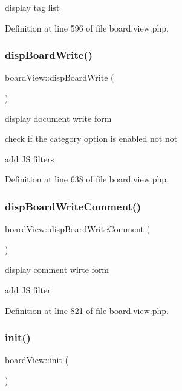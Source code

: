 display tag list 



Definition at line 596 of file board.\+view.\+php.

\mbox{\label{classboardView_a87d07de32e6b22b5b56eaa0e0f55e2a0}} 
\subsubsection{\texorpdfstring{disp\+Board\+Write()}{dispBoardWrite()}}
{\footnotesize\ttfamily board\+View\+::disp\+Board\+Write (\begin{DoxyParamCaption}{ }\end{DoxyParamCaption})}



display document write form 

check if the category option is enabled not not

add JS filters

Definition at line 638 of file board.\+view.\+php.

\mbox{\label{classboardView_a8101f306b736fb983f9404f8c9e380f6}} 
\subsubsection{\texorpdfstring{disp\+Board\+Write\+Comment()}{dispBoardWriteComment()}}
{\footnotesize\ttfamily board\+View\+::disp\+Board\+Write\+Comment (\begin{DoxyParamCaption}{ }\end{DoxyParamCaption})}



display comment wirte form 

add JS filter

Definition at line 821 of file board.\+view.\+php.

\mbox{\label{classboardView_afadb8aaf62eac0f18bf8200e15d9fe6a}} 
\subsubsection{\texorpdfstring{init()}{init()}}
{\footnotesize\ttfamily board\+View\+::init (\begin{DoxyParamCaption}{ }\end{DoxyParamCaption})}



